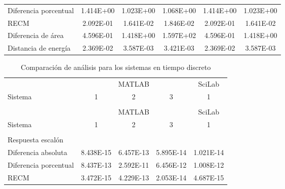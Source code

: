 {\begin{longtable}{l @{\extracolsep{\fill}} ccccc}
            Diferencia porcentual  & \num{1.414E+00} & \num{1.023E+00} & \num{1.068E+00} & \num{1.414E+00} & \num{1.023E+00}  \\
            RECM                   & \num{2.092E-01} & \num{1.641E-02} & \num{1.846E-02} & \num{2.092E-01} & \num{1.641E-02}  \\
            Diferencia de área     & \num{4.596E-01} & \num{1.418E+00} & \num{1.597E+02} & \num{4.596E-01} & \num{1.418E+00}  \\
            Distancia de energía   & \num{2.369E-02} & \num{3.587E-03} & \num{3.421E-03} & \num{2.369E-02} & \num{3.587E-03}  \\
        \end{longtable}}
        
        {\setlength\LTleft{0pt}
        \setlength\LTright{0pt}
        \scriptsize
        \centering
        \renewcommand{\arraystretch}{0.89}
        \begin{longtable}{l @{\extracolsep{\fill}} cccc}
            \caption[Comparación de análisis - tiempo discreto]{Comparación de análisis para los sistemas en tiempo discreto}
            \label{tab:AnalisisStepD} \\
            \toprule
                    & \multicolumn{3}{c}{MATLAB} & SciLab   \\ \cmidrule{2-4}\cmidrule{5-5}
            Sistema &   1     &    2     &    3  &   1      \\ \cmidrule{2-2}\cmidrule{3-3}\cmidrule{4-4}\cmidrule{5-5}
            & & & & \\
            \endfirsthead
            \toprule
                    & \multicolumn{3}{c}{MATLAB} & SciLab   \\ \cmidrule{2-4}\cmidrule{5-5}
            Sistema &   1     &    2     &    3  &   1      \\ \cmidrule{2-2}\cmidrule{3-3}\cmidrule{4-4}\cmidrule{5-5}
            & & & & \\
            \endhead
            \bottomrule
            \endfoot
            Respuesta escalón      & & & & \\ \cmidrule{1-1}
            Diferencia absoluta    & \num{8.438E-15} & \num{6.457E-13} & \num{5.895E-14} & \num{1.021E-14}  \\
            Diferencia porcentual  & \num{8.437E-13} & \num{2.592E-11} & \num{6.456E-12} & \num{1.008E-12}  \\
            RECM                   & \num{3.472E-15} & \num{4.229E-13} & \num{2.053E-14} & \num{4.687E-15}  \\

\end{longtable}}
